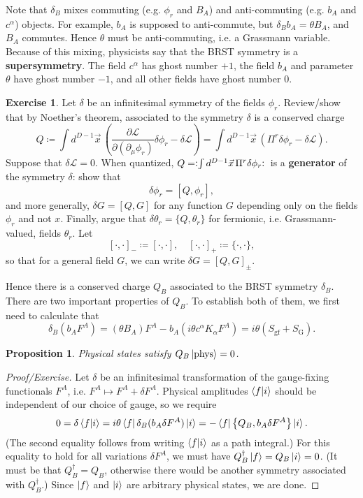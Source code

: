 \documentclass{report}
\theoremstyle{plain}
\newtheorem{proposition}[theorem]{Proposition}
\theoremstyle{definition}
\newtheorem{exercise}{Exercise}[section]
\theoremstyle{remark}
\newcommand{\di}{\partial}
\newcommand{\NO}[1]{\vcentcolon\mathrel{#1}\vcentcolon\,}
\newcommand{\cL}{\mathcal{L}}
\newcommand{\pder}[2]{\frac{\partial #1}{\partial #2}}
\begin{document}
Note that $\delta_B$ mixes commuting (e.g. $\phi_r$ and $B_A$) and
anti-commuting (e.g. $b_A$ and $c^\alpha$) objects. For example, $b_A$
is supposed to anti-commute, but $\delta_B b_A = \theta B_A$, and
$B_A$ commutes. Hence $\theta$ must be anti-commuting, i.e. a
Grassmann variable. Because of this mixing, physicists say that the
BRST symmetry is a {\bf supersymmetry}. The field $c^\alpha$ has ghost
number $+1$, the field $b_A$ and parameter $\theta$ have ghost number
$-1$, and all other fields have ghost number $0$.

\begin{exercise}
  Let $\delta$ be an infinitesimal symmetry of the fields $\phi_r$.
  Review/show that by Noether's theorem, associated to the symmetry
  $\delta$ is a conserved charge
  \[ Q \coloneqq \int d^{D-1}\vec{x} \, \left(\pder{\cL}{(\di_\mu \phi_r)} \delta \phi_r - \delta \cL\right) = \int d^{D-1}\vec{x} \, \left(\Pi^r \delta \phi_r - \delta \cL\right). \]
  Suppose that $\delta \cL = 0$. When quantized, $Q = \NO{\int
    d^{D-1}\vec{x}\, \Pi^r \delta \phi_r}$ is a {\bf generator} of the
  symmetry $\delta$: show that
  \[ \delta \phi_r = [Q, \phi_r], \]
  and more generally, $\delta G = [Q, G]$ for any function $G$
  depending only on the fields $\phi_r$ and not $x$. Finally, argue
  that $\delta \theta_r = \{Q, \theta_r\}$ for fermionic, i.e.
  Grassmann-valued, fields $\theta_r$. Let
  \[ [\cdot, \cdot]_- \coloneqq [\cdot, \cdot], \quad [\cdot, \cdot]_+ \coloneqq \{\cdot, \cdot\}, \]
  so that for a general field $G$, we can write $\delta G = [Q,
    G]_{\pm}$.
\end{exercise}

Hence there is a conserved charge $Q_B$ associated to the BRST
symmetry $\delta_B$. There are two important properties of $Q_B$. To
establish both of them, we first need to calculate that
\[ \delta_B(b_A F^A) = (\theta B_A) F^A - b_A (i\theta c^\alpha K_\alpha F^A) = i\theta (S_{\text{gf}} + S_{\text{G}}). \]

\begin{proposition}
  Physical states satisfy $Q_B\ket{\mathrm{phys}} = 0$.
\end{proposition}

\begin{proof}[Proof/Exercise]
  Let $\delta$ be an infinitesimal transformation of the gauge-fixing
  functionals $F^A$, i.e. $F^A \mapsto F^A + \delta F^A$. Physical
  amplitudes $\braket{f|i}$ should be independent of our choice of
  gauge, so we require
  \[ 0 = \delta \braket{f|i} = i\theta \bra{f}\delta_B(b_A \delta F^A)\ket{i} = -\bra{f}\left\{Q_B, b_A \delta F^A\right\}\ket{i}. \]
  (The second equality follows from writing $\braket{f|i}$ as a path
  integral.) For this equality to hold for all variations $\delta
  F^A$, we must have $Q_B^\dag\ket{f} = Q_B\ket{i} = 0$. (It must be
  that $Q_B^\dag = Q_B$, otherwise there would be another symmetry
  associated with $Q_B^\dag$.) Since $\ket{f}$ and $\ket{i}$ are
  arbitrary physical states, we are done.
\end{proof}
\end{document}
